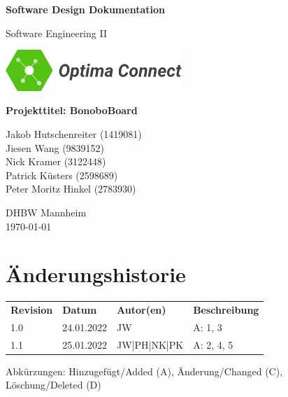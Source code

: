 \documentclass[a4paper,11pt]{scrartcl}
\begin{document}
\renewcommand*{\arraystretch}{1.2}
\begin{titlepage}
    \begin{center}
        \vspace*{1cm}\Huge
        \textbf{Software Design Dokumentation}\par                
        \vspace{0.5cm}\LARGE        
        Software Engineering II\par           
        \vspace{2cm}
        \includegraphics[width=0.5\textwidth]{OptimaLogo_long}\par   
        \vspace{1cm}
        \textbf{Projekttitel: BonoboBoard}\par        
        \vfill\Large   
        Jakob Hutschenreiter (1419081)\\Jiesen Wang (9839152)\\Nick Kramer (3122448)\\Patrick Küsters (2598689)\\Peter Moritz Hinkel (2783930)\par
        \vspace{2cm}
        DHBW Mannheim\\
        \today     
    \end{center}
\end{titlepage}

\section*{Änderungshistorie}
\begin{table}[h]
	\begin{tabular}{@{} p{20mm} p{25mm} p{25mm} p{75mm}}
		\textbf{Revision} & \textbf{Datum} & \textbf{Autor(en)} & \textbf{Beschreibung}\\
		1.0 & 24.01.2022 & JW & A: 1, 3 \\ 
		1.1 & 25.01.2022 & JW|PH|NK|PK & A: 2, 4, 5  \\ 
	\end{tabular}
\end{table}
\noindent
Abkürzungen: Hinzugefügt/Added (A), Änderung/Changed (C), Löschung/Deleted (D)
\vspace{2cm}
\tableofcontents
\newpage
{}
\end{document}
